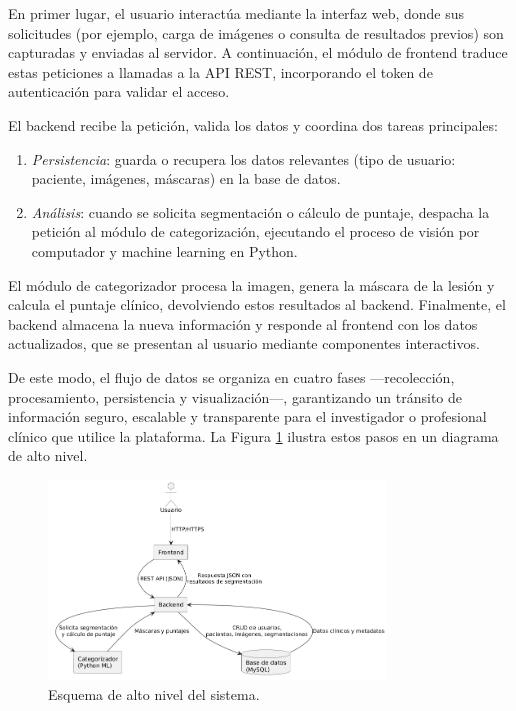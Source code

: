 En primer lugar, el usuario interactúa mediante la interfaz web, donde sus solicitudes (por ejemplo, carga de imágenes o consulta de resultados previos) son capturadas y enviadas al servidor. A continuación, el módulo de frontend traduce estas peticiones a llamadas a la API REST, incorporando el token de autenticación para validar el acceso. 

El backend recibe la petición, valida los datos y coordina dos tareas principales:  
\begin{enumerate}
  \item \emph{Persistencia}: guarda o recupera los datos relevantes (tipo de usuario: paciente, imágenes, máscaras) en la base de datos.
  \item \emph{Análisis}: cuando se solicita segmentación o cálculo de puntaje, despacha la petición al módulo de categorización, ejecutando el proceso de visión por computador y machine learning en Python.
\end{enumerate}

El módulo de categorizador procesa la imagen, genera la máscara de la lesión y calcula el puntaje clínico, devolviendo estos resultados al backend. Finalmente, el backend almacena la nueva información y responde al frontend con los datos actualizados, que se presentan al usuario mediante componentes interactivos.  

De este modo, el flujo de datos se organiza en cuatro fases —recolección, procesamiento, persistencia y visualización—, garantizando un tránsito de información seguro, escalable y transparente para el investigador o profesional clínico que utilice la plataforma. La Figura \ref{fig:arquitectura-alto-nivel} ilustra estos pasos en un diagrama de alto nivel.  

\begin{figure}[H]
  \centering
  \includegraphics[width=0.8\textwidth,height=0.5\textheight,keepaspectratio]{imagenes/esquemaAlto.png}
  \caption{Esquema de alto nivel del sistema.}
  \label{fig:arquitectura-alto-nivel}
\end{figure}


